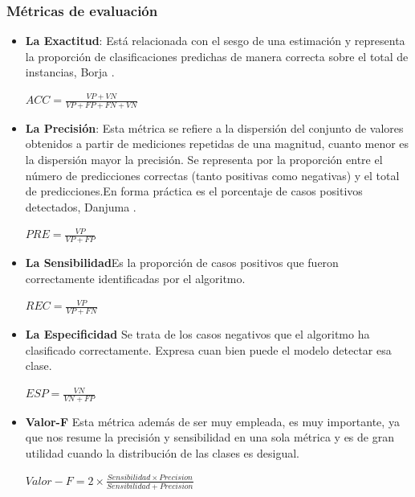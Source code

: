 \subsubsection*{Métricas de evaluación}\label{sec:metricas1}
\begin{itemize}
     \item \textbf{La Exactitud}: Está relacionada con el sesgo de una estimación y representa la proporción de clasificaciones predichas de manera correcta sobre el total de instancias, Borja \cite{borja2020estandarizacion}.\\ 
    \begin{center}
    $ACC = \frac{VP + VN}{VP + FP + FN + VN}$
    \end{center}
    \item \textbf{La Precisión}: Esta métrica se refiere a la dispersión del conjunto de valores obtenidos a partir de mediciones repetidas de una magnitud, cuanto menor es la dispersión mayor la precisión. Se representa por la proporción entre el número de predicciones correctas (tanto positivas como negativas) y el total de predicciones.En forma práctica es  el porcentaje de casos positivos detectados, Danjuma \cite{danjuma2015performance}.
     \begin{center}
    $PRE = \frac{VP}{VP + FP}$
    \end{center}
    \item \textbf{La Sensibilidad}Es la proporción de casos positivos que fueron correctamente identificadas por el algoritmo.
    \begin{center}
    $REC = \frac{VP}{VP + FN}$
    \end{center}
    
    \item \textbf{La Especificidad} Se trata de los casos negativos que el algoritmo ha clasificado correctamente.  Expresa cuan bien puede el modelo detectar esa clase.
     \begin{center}
    $ESP = \frac{VN}{VN + FP}$
    \end{center}
    
    \item \textbf{Valor-F} Esta métrica además de ser muy empleada, es muy importante, ya que nos resume la precisión y sensibilidad en una sola métrica y es de gran utilidad cuando la distribución de las clases es desigual.
    \begin{center}
    $Valor-F = 2\times \frac{Sensibilidad \times Precision}{Sensibilidad + Precision}$
    \end{center}
    

\end{itemize}
